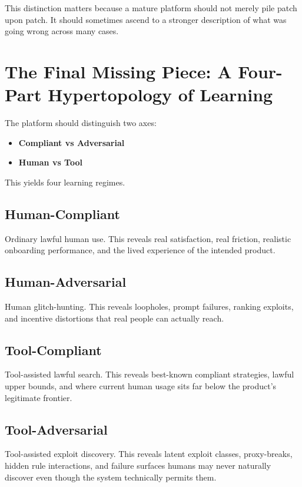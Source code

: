 \documentclass[11pt]{article}
\begin{document}
This distinction matters because a mature platform should not merely pile patch upon patch. It should sometimes ascend to a stronger description of what was going wrong across many cases.

\section{The Final Missing Piece: A Four-Part Hypertopology of Learning}

The platform should distinguish two axes:

\begin{itemize}
  \item \textbf{Compliant vs Adversarial}
  \item \textbf{Human vs Tool}
\end{itemize}

This yields four learning regimes.

\subsection{Human-Compliant}

Ordinary lawful human use. This reveals real satisfaction, real friction, realistic onboarding performance, and the lived experience of the intended product.

\subsection{Human-Adversarial}

Human glitch-hunting. This reveals loopholes, prompt failures, ranking exploits, and incentive distortions that real people can actually reach.

\subsection{Tool-Compliant}

Tool-assisted lawful search. This reveals best-known compliant strategies, lawful upper bounds, and where current human usage sits far below the product's legitimate frontier.

\subsection{Tool-Adversarial}

Tool-assisted exploit discovery. This reveals latent exploit classes, proxy-breaks, hidden rule interactions, and failure surfaces humans may never naturally discover even though the system technically permits them.
\end{document}
